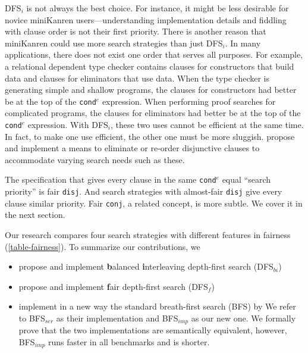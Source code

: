 \documentclass[format=acmlarge, review=false, authordraft=false]{acmart}
\newcommand{\conde}{\texttt{cond$^e$}}
\newcommand{\conj}{\texttt{conj}}
\newcommand{\disj}{\texttt{disj}}
\newcommand{\DFSi }[0]{DFS$_{i}$}
\newcommand{\DFSf }[0]{DFS$_{f}$}
\newcommand{\DFSbi}[0]{DFS$_{bi}$}
\newcommand{\BFS}[0]{BFS}
\newcommand{\BFSser}[0]{BFS$_{ser}$}
\newcommand{\BFSimp}[0]{BFS$_{imp}$}
\begin{document}
\DFSi{} is not always the best choice. For instance, it might be less 
desirable for novice miniKanren users---understanding implementation details 
and fiddling with clause order is not their first priority. 
There is another reason that miniKanren could use more search strategies than
just \DFSi. In many applications, there does not exist one order that serves all
purposes. For example, a relational dependent type checker contains
clauses for constructors that build data and clauses for eliminators that use
data. When the type checker is generating simple and shallow programs,
the clauses for constructors had better be at the top of the
\conde{} expression.
When performing proof searches for complicated programs, the clauses for 
eliminators had better be at the top of the \conde{} expression. With \DFSi, 
these two uses cannot be efficient at the same time. In fact, to make one use 
efficient, the other one must be more sluggish. \citet{boskin} propose and 
implement a means to eliminate or re-order disjunctive clauses to accommodate 
varying search needs such as these.

The specification that gives every clause in the same \conde{} equal 
``search priority'' is fair \disj{}. And search strategies with 
almost-fair \disj{} give every clause similar priority. 
Fair \conj{}, a related concept, is more subtle. We cover it in the next 
section.


Our research compares four search strategies with different features in fairness
(\autoref{table-fairness}). To summarize our contributions, we
\begin{itemize}
	\item propose and implement \textbf{b}alanced \textbf{i}nterleaving 
	depth-first search (\DFSbi{})
	\item propose and implement \textbf{f}air depth-first search (\DFSf{})
	\item implement in a new way the standard breath-first search (\BFS) by 
	\citet{seres1999algebra}
	We refer to \BFSser{} as their implementation and \BFSimp{} as our new 
	one. We formally prove that the two implementations are 
	semantically equivalent, however, \BFSimp{} runs faster in all benchmarks 
	and 
	is shorter.
\end{itemize}
\end{document}
